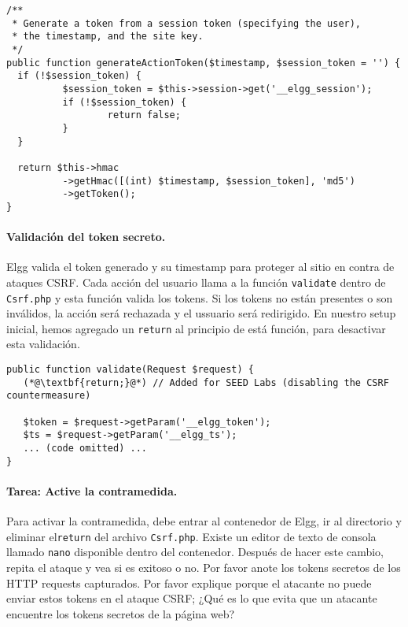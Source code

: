 \begin{lstlisting}
/**
 * Generate a token from a session token (specifying the user), 
 * the timestamp, and the site key.
 */
public function generateActionToken($timestamp, $session_token = '') {
  if (!$session_token) {
          $session_token = $this->session->get('__elgg_session');
          if (!$session_token) {
                  return false;
          }
  }

  return $this->hmac
          ->getHmac([(int) $timestamp, $session_token], 'md5')
          ->getToken();
}
\end{lstlisting}


\paragraph{Validación del token secreto.}
Elgg valida el token generado y su timestamp para proteger al sitio en contra de ataques CSRF. Cada acción del usuario llama a la función \texttt{validate} dentro de \texttt{Csrf.php} y esta función valida los tokens.
Si los tokens no están presentes o son inválidos, la acción será rechazada y el ussuario será redirigido. En nuestro setup inicial, hemos agregado un \texttt{return} al principio de está función, para desactivar esta validación.

\begin{lstlisting}
public function validate(Request $request) {
   (*@\textbf{return;}@*) // Added for SEED Labs (disabling the CSRF countermeasure)

   $token = $request->getParam('__elgg_token');
   $ts = $request->getParam('__elgg_ts');
   ... (code omitted) ...
}
\end{lstlisting}



\paragraph{Tarea: Active la contramedida.}
Para activar la contramedida, debe entrar al contenedor de Elgg, ir al directorio 
 y eliminar el\texttt{return} del archivo  \texttt{Csrf.php}.
Existe un editor de texto de consola llamado \texttt{nano} disponible dentro del contenedor. Después de hacer este cambio, repita el ataque y vea si es exitoso o no.
Por favor anote los tokens secretos de los HTTP requests capturados.
Por favor explique porque el atacante no puede enviar estos tokens en el ataque CSRF; ¿Qué es lo que evita que un atacante encuentre los tokens secretos de la página web?

